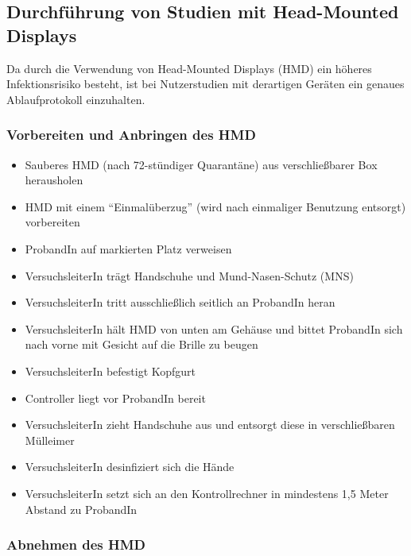 \subsection{Durchführung von Studien mit Head-Mounted Displays}\label{subsec:nutzerstudien_hmd}

Da durch die Verwendung von Head-Mounted Displays (HMD) ein höheres Infektionsrisiko besteht, ist bei Nutzerstudien mit derartigen Geräten ein genaues Ablaufprotokoll einzuhalten.

\subsubsection*{Vorbereiten und Anbringen des HMD}

{
\singlespacing
\begin{itemize}
    \item Sauberes HMD (nach 72-stündiger Quarantäne) aus verschließbarer Box herausholen
    \item HMD mit einem “Einmalüberzug” (wird nach einmaliger Benutzung entsorgt) vorbereiten
    \item ProbandIn auf markierten Platz verweisen 
    \item VersuchsleiterIn trägt Handschuhe und Mund-Nasen-Schutz (MNS)
    \item VersuchsleiterIn tritt ausschließlich seitlich an ProbandIn heran
    \item VersuchsleiterIn hält HMD von unten am Gehäuse und bittet ProbandIn sich nach vorne mit Gesicht auf die Brille zu beugen 
    \item VersuchsleiterIn befestigt Kopfgurt 
    \item Controller liegt vor ProbandIn bereit 
    \item VersuchsleiterIn zieht Handschuhe aus und entsorgt diese in verschließbaren Mülleimer
    \item VersuchsleiterIn desinfiziert sich die Hände
    \item VersuchsleiterIn setzt sich an den Kontrollrechner in mindestens 1,5 Meter Abstand zu ProbandIn
\end{itemize}
}

\subsubsection*{Abnehmen des HMD}

